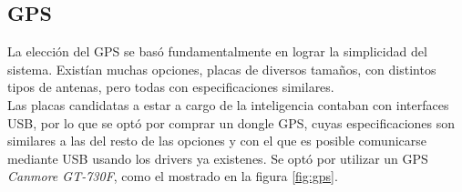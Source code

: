 \documentclass[main]{subfiles}
\begin{document}
\subsection{GPS}

La elecci\'on del GPS se bas\'o fundamentalmente en lograr la simplicidad del sistema. Exist\'ian muchas opciones, placas de diversos tama\~nos, con distintos tipos de antenas, pero todas con especificaciones similares.\\

Las placas candidatas a estar a cargo de la inteligencia contaban con interfaces USB, por lo que se opt\'o por comprar un dongle GPS, cuyas especificaciones son similares a las del resto de las opciones y con el que es posible comunicarse mediante USB usando los drivers ya existenes. Se opt\'o por utilizar un GPS \textit{Canmore GT-730F}, como el mostrado en la figura \ref{fig:gps}.
\end{document}
